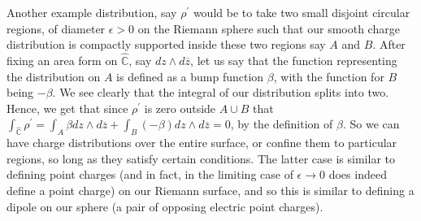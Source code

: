 \documentclass[11pt]{report}
\theoremstyle{definition}
\begin{document}
Another example distribution, say $\rho^{\prime}$ would be to take two small disjoint circular regions, of diameter $\epsilon > 0$ on the Riemann sphere such that our smooth charge distribution is compactly supported inside these two regions say $A$ and $B$. After fixing an area form on $\widehat{\mathbb{C}}$, say $dz \wedge d\overline{z}$, let us say that the function representing the distribution on $A$ is defined as a bump function $\beta$, with the function for $B$ being $-\beta$. We see clearly that the integral of our distribution splits into two. Hence, we get that since $\rho^{\prime}$ is zero outside $A \cup B$ that $\int_{\widehat{\mathbb{C}}} \rho^{\prime} = \int_A \beta dz\wedge d\overline{z} + \int_B (-\beta) dz\wedge d\overline{z} = 0$, by the definition of $\beta$. So we can have charge distributions over the entire surface, or confine them to particular regions, so long as they satisfy certain conditions. The latter case is similar to defining point charges (and in fact, in the limiting case of $\epsilon \rightarrow 0$ does indeed define a point charge) on our Riemann surface, and so this is similar to defining a dipole on our sphere (a pair of opposing electric point charges). 
\end{document}
